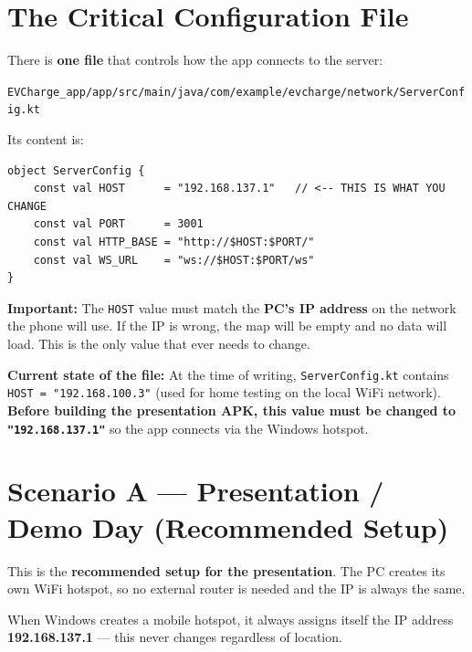 \documentclass[12pt,a4paper]{article}
\begin{document}
\section{The Critical Configuration File}

There is \textbf{one file} that controls how the app connects to the server:

\begin{codebox}
\texttt{EVCharge\_app/app/src/main/java/com/example/evcharge/network/ServerConfig.kt}
\end{codebox}

\noindent Its content is:

\begin{codebox}
\begin{verbatim}
object ServerConfig {
    const val HOST      = "192.168.137.1"   // <-- THIS IS WHAT YOU CHANGE
    const val PORT      = 3001
    const val HTTP_BASE = "http://$HOST:$PORT/"
    const val WS_URL    = "ws://$HOST:$PORT/ws"
}
\end{verbatim}
\end{codebox}

\begin{warnbox}
\textbf{Important:} The \texttt{HOST} value must match the \textbf{PC's IP address} on
the network the phone will use. If the IP is wrong, the map will be empty and no data
will load. This is the only value that ever needs to change.
\end{warnbox}

\begin{warnbox}
\textbf{Current state of the file:} At the time of writing, \texttt{ServerConfig.kt}
contains \texttt{HOST = "192.168.100.3"} (used for home testing on the local WiFi
network). \textbf{Before building the presentation APK, this value must be changed to
\texttt{"192.168.137.1"}} so the app connects via the Windows hotspot.
\end{warnbox}

\section{Scenario A --- Presentation / Demo Day (Recommended Setup)}

This is the \textbf{recommended setup for the presentation}. The PC creates its own
WiFi hotspot, so no external router is needed and the IP is always the same.

\begin{infobox}
When Windows creates a mobile hotspot, it always assigns itself the IP address
\textbf{192.168.137.1} --- this never changes regardless of location.
\end{infobox}
\end{document}
